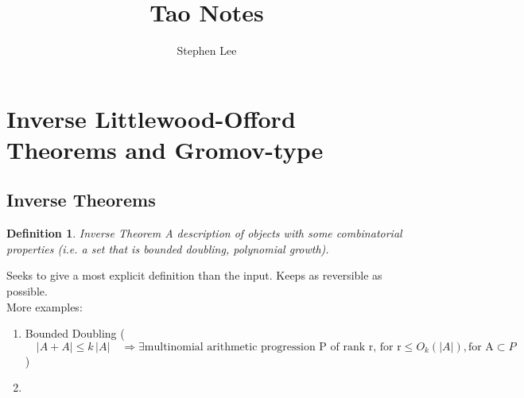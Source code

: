 \documentclass{article}
\author{Stephen Lee}
\title{Tao Notes}
\newtheorem{definition}{Definition}[section]
\begin{document}
\maketitle

\section{Inverse Littlewood-Offord Theorems and Gromov-type}
\subsection{Inverse Theorems}
\begin{definition}{Inverse Theorem}
A description of objects with some combinatorial properties (i.e. a set that is bounded doubling, polynomial growth). 
\end{definition}
Seeks to give a most explicit definition than the input. Keeps as reversible as possible. \\
More examples: \begin{enumerate}
  \item Bounded Doubling ($\quad|A+A| \le k\,|A|\quad \Rightarrow %
    \exists \text{multinomial arithmetic progression P of rank r, for r} \le O_k(|A|), \text{for A} \subset P$)
\item 
\end{enumerate}
\end{document}
